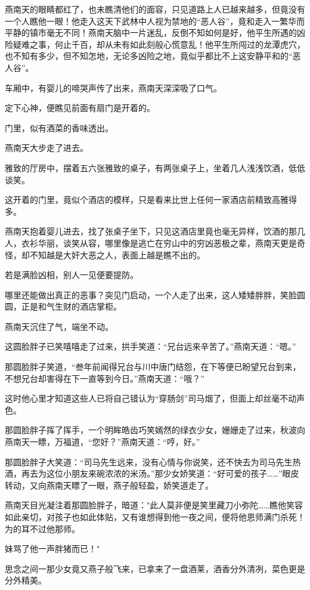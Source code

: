 \documentclass[12pt,oneside]{book}
\begin{document}
燕南天的眼睛都红了，也未瞧清他们的面容，只见道路上人已越来越多，但竟没有一个人瞧他一眼！他走入这天下武林中人视为禁地的``恶人谷''，竟和走入一繁华而平静的镇市毫无不同！燕南天脑中一片迷乱，反倒不知如何是好，他平生所遇的凶险疑难之事，何止千百，却从未有如此刻般心慌意乱！他平生所闯过的龙潭虎穴，也不知有多少，但不知怎地，无论多凶险之地，竟似乎都比不上这安静平和的``恶人谷''。

车厢中，有婴儿的啼哭声传了出来，燕南天深深吸了口气。

定下心神，便瞧见前面有扇门是开着的。

门里，似有酒菜的香味透出。

燕南天大步走了进去。

雅致的厅房中，摆着五六张雅致的桌子，有两张桌子上，坐着几人浅浅饮酒，低低谈笑。

这开着的门里，竟似个酒店的模样，只是看来比世上任何一家酒店前精致高雅得多。

燕南天抱着婴儿进去，找了张桌子坐下，只见这酒店里竟也毫无异样，饮酒的那几人，衣衫华丽，谈笑从容，哪里像是逃亡在穷山中的穷凶恶极之辈，燕南天更是奇怪，却不知越是大奸大恶之人，表面上越是瞧不出的。

若是满脸凶相，别人一见便要提防。

哪里还能做出真正的恶事？突见门启动，一个人走了出来，这人矮矮胖胖，笑脸圆圆，正是和气生财的酒店掌柜。

燕南天沉住了气，端坐不动。

这圆脸胖子已笑嘻嘻走了过来，拱手笑道：``兄台远来辛苦了。''燕南天道：``嗯。''

那圆脸胖子笑道，``叁年前闻得兄台与川中唐门结怨，在下等便已盼望兄台到来，不想兄台却害得在下一直等到今日。''燕南天道：``哦？''

这时他心里才知道这些人已将自己错认为``穿肠剑''司马烟了，但面上却丝毫不动声色。

那圆脸胖子挥了挥手，一个明眸皓齿巧笑嫣然的绿衣少女，姗姗走了过来，秋波向燕南天一瞟，万福道，``您好？''燕南天道：``哼，好。''

那圆脸胖子大笑道：``司马先生远来，没有心情与你说笑，还不快去为司马先生热酒，再去为这位小朋友来碗浓浓的米汤。''那少女娇笑道：``好可爱的孩子\ldots\ldots{}''眼皮转动，又向燕南天瞟了一眼，燕子般轻盈，娇笑道走了。

燕南天目光凝注着那圆脸胖子，暗道："此人莫非便是笑里藏刀小弥陀\ldots\ldots 瞧他笑容如此亲切，对孩子也如此体贴，又有谁想得到他一夜之间，便将他恩师满门杀死！为的耳不过他那师。

妹骂了他一声胖猪而已！"

思念之间一那少女竟又燕子般飞来，已拿来了一盘酒莱，酒香分外清冽，菜色更是分外精美。
\end{document}
